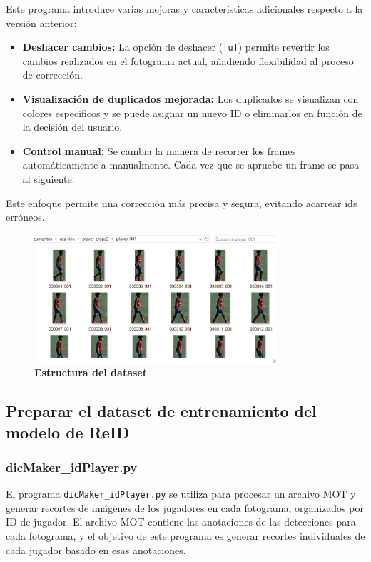 \documentclass[12pt, a4paper, twoside]{article}
\begin{document}
	Este programa introduce varias mejoras y características adicionales respecto a la versión anterior:
	
	\begin{itemize}
		\item \textbf{Deshacer cambios:} La opción de deshacer (\texttt{[u]}) permite revertir los cambios realizados en el fotograma actual, añadiendo flexibilidad al proceso de corrección.
		\item \textbf{Visualización de duplicados mejorada:} Los duplicados se visualizan con colores específicos y se puede asignar un nuevo ID o eliminarlos en función de la decisión del usuario.
		\item \textbf{Control manual:} Se cambia la manera de recorrer los frames automáticamente a manualmente. Cada vez que se apruebe un frame se pasa al siguiente.
	\end{itemize}
	
	Este enfoque permite una corrección más precisa y segura, evitando acarrear ids erróneos.
	
	\begin{figure}[H]
		\centering
		\includegraphics[width=0.8\textwidth]{image/dir_reid}
		\caption{\textbf{Estructura del dataset}}
		\label{dir_reid}
	\end{figure}
	
	\subsection{Preparar el dataset de entrenamiento del modelo de ReID}
	
	\subsubsection{dicMaker\_idPlayer.py}
	
	El programa \texttt{dicMaker\_idPlayer.py} se utiliza para procesar un archivo MOT y generar recortes de imágenes de los jugadores en cada fotograma, organizados por ID de jugador. El archivo MOT contiene las anotaciones de las detecciones para cada fotograma, y el objetivo de este programa es generar recortes individuales de cada jugador basado en esas anotaciones.
	
\end{document}
